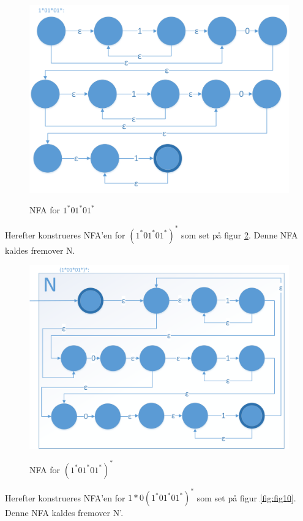 \documentclass[a4paper,10pt,article]{memoir}
\begin{document}
\begin{figure}[h]%
\centering
\includegraphics[width=\textwidth]{Fig8x.png}
\label{fig:fig8}
\caption{NFA for $1^*01^*01^*$}
\end{figure}

Herefter konstrueres NFA'en for $(1^*01^*01^*)^*$ som set på figur \ref{fig:fig9}. Denne NFA kaldes fremover N.

\begin{figure}[h]%
\centering
\includegraphics[width=\textwidth]{Fig9x.png}
\label{fig:fig9}
\caption{NFA for $(1^*01^*01^*)^*$}
\end{figure}

Herefter konstrueres NFA'en for $1*0(1^*01^*01^*)^*$ som set på figur \ref{fig:fig10}. Denne NFA kaldes fremover N'.
\end{document}
